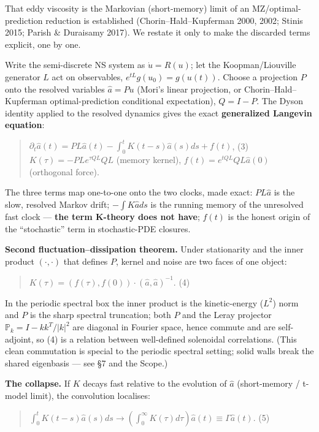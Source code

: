 \documentclass[aps,prfluids,preprint,superscriptaddress,nofootinbib]{revtex4-2}
\begin{document}
That eddy viscosity is the Markovian (short-memory) limit of an MZ/optimal-prediction reduction is established (Chorin–Hald–Kupferman 2000, 2002; Stinis 2015; Parish \& Duraisamy 2017). We restate it only to make the discarded terms explicit, one by one.

Write the semi-discrete NS system as $\dot{u}=R(u)$; let the Koopman/Liouville generator $L$ act on observables, $e^{tL}g(u_{0})=g(u(t))$. Choose a projection $P$ onto the resolved variables $\hat{a}=Pu$ (Mori's linear projection, or Chorin–Hald–Kupferman optimal-prediction conditional expectation), $Q=I-P$. The Dyson identity applied to the resolved dynamics gives the exact \textbf{generalized Langevin equation}:

\begin{quote}
$\partial _{t}\hat{a}(t) = PL\hat{a}(t) - \int _{0}^{t} K(t-s) \hat{a}(s) ds + f(t)$, (3) $K(\tau ) = -P L e^{\tau QL} Q L$ (memory kernel), $f(t)=e^{tQL}QL\hat{a}(0)$ (orthogonal force).
\end{quote}

The three terms map one-to-one onto the two clocks, made exact: $PL\hat{a}$ is the slow, resolved Markov drift; $-\int K \hat{a} ds$ is the running memory of the unresolved fast clock — \textbf{the term K-theory does not have}; $f(t)$ is the honest origin of the ``stochastic'' term in stochastic-PDE closures.

\textbf{Second fluctuation–dissipation theorem.} Under stationarity and the inner product $(\cdot ,\cdot )$ that defines $P$, kernel and noise are two faces of one object:

\begin{quote}
$K(\tau ) = (f(\tau ),f(0))\cdot (\hat{a},\hat{a})^{-1}$. (4)
\end{quote}

In the periodic spectral box the inner product is the kinetic-energy ($L^{2}$) norm and $P$ is the sharp spectral truncation; both $P$ and the Leray projector $\mathbb{P}_{k}=I-kk^{T}/|k|^{2}$ are diagonal in Fourier space, hence commute and are self-adjoint, so (4) is a relation between well-defined solenoidal correlations. (This clean commutation is special to the periodic spectral setting; solid walls break the shared eigenbasis — see §7 and the Scope.)

\textbf{The collapse.} If $K$ decays fast relative to the evolution of $\hat{a}$ (short-memory / t-model limit), the convolution localises:

\begin{quote}
$\int _{0}^{t} K(t-s) \hat{a}(s) ds \longrightarrow  (\int _{0}^\infty  K(\tau )d\tau ) \hat{a}(t) \equiv  \Gamma  \hat{a}(t)$. (5)
\end{quote}
\end{document}
